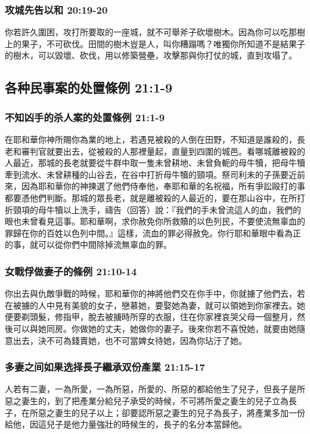 \subsubsection{攻城先告以和 20:19-20}
你若許久圍困，攻打所要取的一座城，就不可舉斧子砍壞樹木。因為你可以吃那樹上的果子，不可砍伐。田間的樹木豈是人，叫你糟蹋嗎？唯獨你所知道不是結果子的樹木，可以毀壞、砍伐，用以修築營壘，攻擊那與你打仗的城，直到攻塌了。

\subsection{各种民事案的处置條例 21:1-9 }
\subsubsection{不知凶手的杀人案的处置條例 21:1-9 }
在耶和華你神所賜你為業的地上，若遇見被殺的人倒在田野，不知道是誰殺的，長老和審判官就要出去，從被殺的人那裡量起，直量到四圍的城邑。看哪城離被殺的人最近，那城的長老就要從牛群中取一隻未曾耕地、未曾負軛的母牛犢，把母牛犢牽到流水、未曾耕種的山谷去，在谷中打折母牛犢的頸項。祭司利未的子孫要近前來，因為耶和華你的神揀選了他們侍奉他，奉耶和華的名祝福，所有爭訟毆打的事都要憑他們判斷。那城的眾長老，就是離被殺的人最近的，要在那山谷中，在所打折頸項的母牛犢以上洗手，禱告（回答）說：『我們的手未曾流這人的血，我們的眼也未曾看見這事。耶和華啊，求你赦免你所救贖的以色列民，不要使流無辜血的罪歸在你的百姓以色列中間。』這樣，流血的罪必得赦免。你行耶和華眼中看為正的事，就可以從你們中間除掉流無辜血的罪。

\subsubsection{女戰俘做妻子的條例 21:10-14 }
你出去與仇敵爭戰的時候，耶和華你的神將他們交在你手中，你就擄了他們去，若在被擄的人中見有美貌的女子，戀慕她，要娶她為妻，就可以領她到你家裡去。她便要剃頭髮，修指甲，脫去被擄時所穿的衣服，住在你家裡哀哭父母一個整月，然後可以與她同房。你做她的丈夫，她做你的妻子。後來你若不喜悅她，就要由她隨意出去，決不可為錢賣她，也不可當婢女待她，因為你玷汙了她。

\subsubsection{多妻之间如果选择長子繼承双份產業 21:15-17 }
人若有二妻，一為所愛，一為所惡，所愛的、所惡的都給他生了兒子，但長子是所惡之妻生的，到了把產業分給兒子承受的時候，不可將所愛之妻生的兒子立為長子，在所惡之妻生的兒子以上；卻要認所惡之妻生的兒子為長子，將產業多加一份給他，因這兒子是他力量強壯的時候生的，長子的名分本當歸他。

